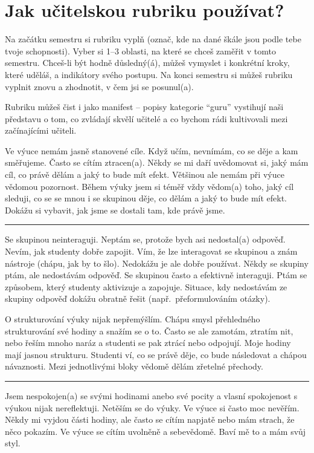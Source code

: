 \section*{Jak učitelskou rubriku používat?}

Na začátku semestru si rubriku vyplň (označ, kde na dané škále jsou podle tebe tvoje schopnosti). Vyber si 1--3 oblasti, na které se chceš zaměřit v tomto semestru. Chceš-li být hodně důsledný(á), můžeš vymyslet i konkrétní kroky, které uděláš, a indikátory svého postupu. Na konci semestru si můžeš rubriku vyplnit znovu a zhodnotit, v čem jsi se posunul(a).

Rubriku můžeš čist i jako manifest -- popisy kategorie \enquote{guru} vystihují naši představu o tom, co zvládají skvělí učitelé a co bychom rádi kultivovali mezi začínajícími učiteli.


\newpage
{}
{Ve výuce nemám jasně stanovené cíle. Když učím, nevnímám, co se děje a kam směřujeme. Často se cítím ztracen(a).}
{Někdy se mi daří uvědomovat si, jaký mám cíl, co právě dělám a jaký to bude mít efekt. Většinou ale nemám při výuce vědomou pozornost.}
{Během výuky jsem si téměř vždy vědom(a) toho, jaký cíl sleduji, co se se mnou i se skupinou děje, co dělám a jaký to bude mít efekt. Dokážu si vybavit, jak jsme se dostali tam, kde právě jsme.}

\rule{\textwidth}{0.4pt}
{Se skupinou neinteraguji. Neptám se, protože bych asi nedostal(a) odpověď. Nevím, jak studenty dobře zapojit.}
{Vím, že lze interagovat se skupinou a znám nástroje (chápu, jak by to šlo). Nedokážu je ale dobře používat. Někdy  se skupiny ptám, ale nedostávám odpověď.}
{Se skupinou často a efektivně interaguji. Ptám se způsobem, který studenty aktivizuje a zapojuje. Situace, kdy nedostávám ze skupiny odpověď dokážu obratně řešit (např.\ přeformulováním otázky).}

\newpage
{}
{O strukturování výuky nijak nepřemýšlím.}
{Chápu smysl přehledného strukturování své hodiny a snažím se o to. Často se ale zamotám, ztratím nit, nebo řeším mnoho naráz a studenti se pak ztrácí nebo odpojují.}
{Moje hodiny mají jasnou strukturu. Studenti ví, co se právě děje, co bude následovat a chápou návaznosti. Mezi jednotlivými bloky vědomě dělám zřetelné přechody.}

\rule{\textwidth}{0.4pt}
{Jsem nespokojen(a) se svými hodinami anebo své pocity a vlasní spokojenost s výukou nijak nereflektuji. Netěším se do výuky.}
{Ve výuce si často moc nevěřím. Někdy mi vyjdou části hodiny, ale často se cítím napjatě nebo mám strach, že něco pokazím.}
{Ve výuce se cítím uvolněně a sebevědomě. Baví mě to a mám svůj styl.}

